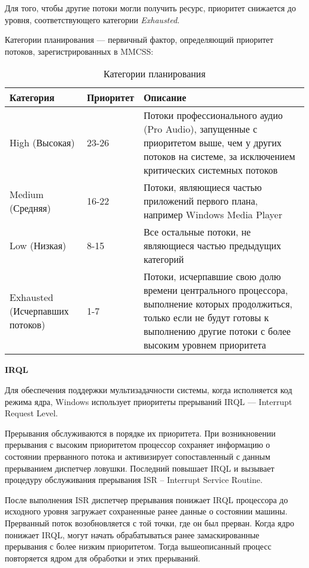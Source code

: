 Для того, чтобы другие потоки могли получить ресурс, приоритет снижается до уровня, соответствующего категории \textit{Exhausted}.

Категории планирования --- первичный фактор, определяющий приоритет потоков, зарегистрированных в MMCSS:
\begin{table}[H]
	\begin{center}
		\caption{Категории планирования}	
		\label{tab:category}
		\begin{tabular}{|p{40mm}|p{30mm}|p{80mm}|}
			\hline
			\textbf{Категория} & \textbf{Приоритет} & \textbf{Описание} \\
			\hline
			High (Высокая) & 23-26 & Потоки профессионального аудио (Pro
			Audio), запущенные с приоритетом выше, чем у других потоков на системе, за
			исключением критических системных потоков \\
			\hline
			Medium (Средняя) & 16-22 & Потоки, являющиеся частью приложений
			первого плана, например Windows Media Player \\
			\hline
			Low (Низкая) & 8-15 & Все остальные потоки, не являющиеся частью
			предыдущих категорий \\
			\hline
			Exhausted (Исчерпавших потоков) & 1-7 & Потоки, исчерпавшие свою
			долю времени центрального процессора, выполнение которых продолжиться, только
			если не будут готовы к выполнению другие потоки с более высоким уровнем
			приоритета \\
			\hline
		\end{tabular}
	\end{center}
\end{table}

\textbf{IRQL}

Для обеспечения поддержки мультизадачности системы, когда исполняется код режима ядра, Windows использует приоритеты прерываний IRQL --- Interrupt Request Level.

Прерывания обслуживаются в порядке их приоритета. При возникновении прерывания с высоким приоритетом процессор сохраняет информацию о состоянии прерванного потока и активизирует сопоставленный с данным прерыванием диспетчер ловушки. Последний повышает IRQL и вызывает
процедуру обслуживания прерывания ISR -- Interrupt Service Routine.

После выполнения ISR диспетчер прерывания понижает IRQL процессора до исходного уровня загружает сохраненные ранее данные о состоянии машины. Прерванный поток возобновляется с той точки, где он был прерван. Когда ядро понижает IRQL, могут начать обрабатываться ранее замаскированные прерывания с более низким приоритетом. Тогда вышеописанный процесс повторяется ядром для обработки и этих прерываний.

